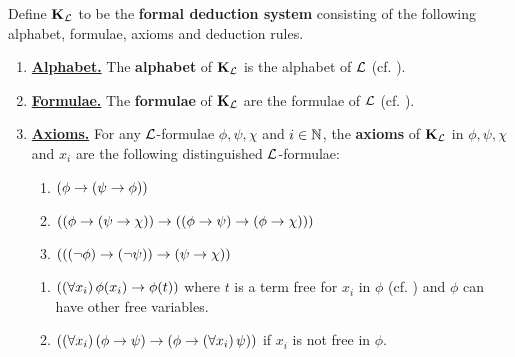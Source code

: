 \begin{boxdefinition}
    Define $\mathbf{K}_{\mathcal{L}}$ to be the \textbf{formal deduction system} consisting of the following alphabet, formulae, axioms and deduction rules.
    \begin{enumerate}
        \item \textbf{\underline{Alphabet.}} The \textbf{alphabet} of $\mathbf{K}_{\mathcal{L}}$ is the alphabet of $\mathcal{L}$ (cf. ).
        
        \item \textbf{\underline{Formulae.}} The \textbf{formulae} of $\mathbf{K}_{\mathcal{L}}$ are the formulae of $\mathcal{L}$ (cf. ).
        
        \item \textbf{\underline{Axioms.}} For any $\mathcal{L}$-formulae $\phi, \psi, \chi$ and $i \in \mathbb{N}$, the \textbf{axioms} of $\mathbf{K}_{\mathcal{L}}$ in $\phi, \psi, \chi$ and $x_i$ are the following distinguished $\mathcal{L}$-formulae:
        \begin{enumerate}[label = \normalfont (A\arabic*)]
            \item\label{FO:A1}
            $\displaystyle \left( \phi \to \left( \psi \to \phi \right) \right)$
            \item\label{FO:A2}
            $\displaystyle \left( \left( \phi \to \left( \psi \to \chi \right) \right) \to \left( \left( \phi \to \psi \right) \to \left( \phi \to \chi \right) \right) \right)$
            \item\label{FO:A3}
            $\displaystyle \left( \left( \left( \neg \phi \right) \to \left( \neg \psi \right) \right) \to \left( \psi \to \chi \right) \right)$
        \end{enumerate}
        \begin{enumerate}[label = \normalfont (K\arabic*)]
            \item\label{FO:K1}
            $\displaystyle \left( \left( \forall x_i \right)\phi\!\left( x_i \right) \to \phi\!\left( t \right) \right)$
            where $t$ is a term free for $x_i$ in $\phi$ (cf. \sorry) and $\phi$ can have other free variables.
            \item\label{FO:K2}
            $\displaystyle \left( \left( \forall x_i \right)\left( \phi \to \psi \right) \to \left( \phi \to \left( \forall x_i \right)\psi \right) \right)$
            if $x_i$ is not free in $\phi$.
        \end{enumerate}


\end{enumerate}
\end{boxdefinition}
